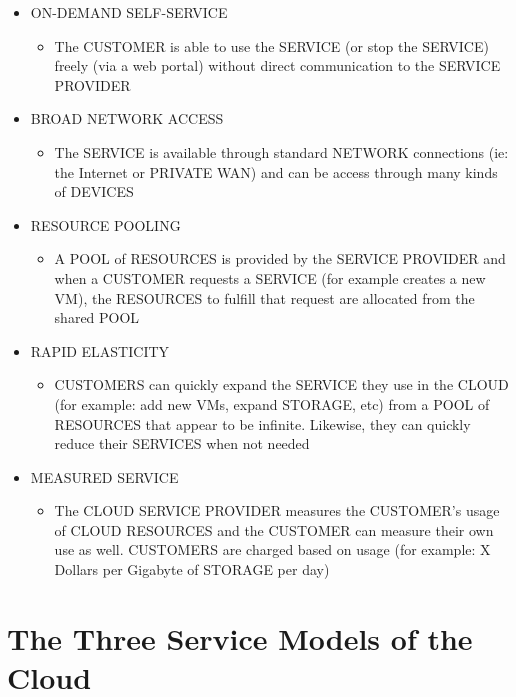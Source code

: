 \begin{itemize}
\tightlist
\item
  ON-DEMAND SELF-SERVICE

  \begin{itemize}
  \tightlist
  \item
    The CUSTOMER is able to use the SERVICE (or stop the SERVICE) freely
    (via a web portal) without direct communication to the SERVICE
    PROVIDER
  \end{itemize}
\item
  BROAD NETWORK ACCESS

  \begin{itemize}
  \tightlist
  \item
    The SERVICE is available through standard NETWORK connections (ie:
    the Internet or PRIVATE WAN) and can be access through many kinds of
    DEVICES
  \end{itemize}
\item
  RESOURCE POOLING

  \begin{itemize}
  \tightlist
  \item
    A POOL of RESOURCES is provided by the SERVICE PROVIDER and when a
    CUSTOMER requests a SERVICE (for example creates a new VM), the
    RESOURCES to fulfill that request are allocated from the shared POOL
  \end{itemize}
\item
  RAPID ELASTICITY

  \begin{itemize}
  \tightlist
  \item
    CUSTOMERS can quickly expand the SERVICE they use in the CLOUD (for
    example: add new VMs, expand STORAGE, etc) from a POOL of RESOURCES
    that appear to be infinite. Likewise, they can quickly reduce their
    SERVICES when not needed
  \end{itemize}
\item
  MEASURED SERVICE

  \begin{itemize}
  \tightlist
  \item
    The CLOUD SERVICE PROVIDER measures the CUSTOMER's usage of CLOUD
    RESOURCES and the CUSTOMER can measure their own use as well.
    CUSTOMERS are charged based on usage (for example: X Dollars per
    Gigabyte of STORAGE per day)
  \end{itemize}
\end{itemize}

\section{The Three Service Models of the
Cloud}\label{the-three-service-models-of-the-cloud}

